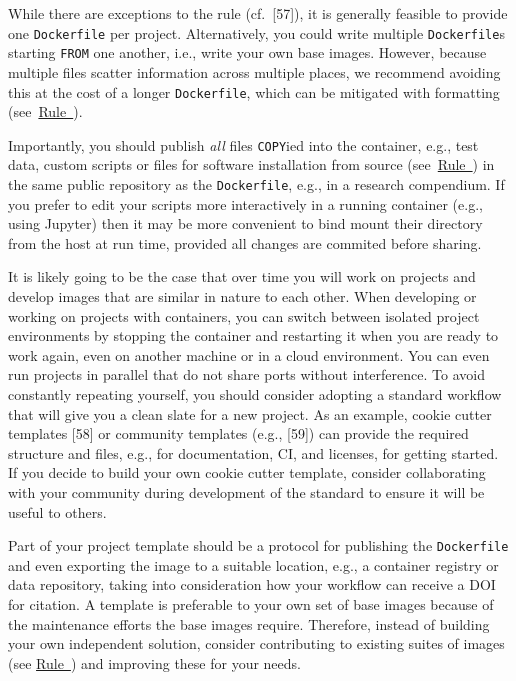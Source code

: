 \documentclass[10pt,letterpaper]{article}
\begin{document}
While there are exceptions to the rule (cf.~{[}57{]}), it is generally
feasible to provide one \texttt{Dockerfile} per project. Alternatively,
you could write multiple \texttt{Dockerfile}s starting \texttt{FROM} one
another, i.e., write your own base images. However, because multiple
files scatter information across multiple places, we recommend avoiding
this at the cost of a longer \texttt{Dockerfile}, which can be mitigated
with formatting
(see~\hyperref[{rule:formatting}]{Rule~}).

Importantly, you should publish \emph{all} files \texttt{COPY}ied into
the container, e.g., test data, custom scripts or files for software
installation from source
(see~\hyperref[{rule:mount}]{Rule~}) in the same
public repository as the \texttt{Dockerfile}, e.g., in a research
compendium. If you prefer to edit your scripts more interactively in a
running container (e.g., using Jupyter) then it may be more convenient
to bind mount their directory from the host at run time, provided all
changes are commited before sharing.

It is likely going to be the case that over time you will work on
projects and develop images that are similar in nature to each other.
When developing or working on projects with containers, you can switch
between isolated project environments by stopping the container and
restarting it when you are ready to work again, even on another machine
or in a cloud environment. You can even run projects in parallel that do
not share ports without interference. To avoid constantly repeating
yourself, you should consider adopting a standard workflow that will
give you a clean slate for a new project. As an example, cookie cutter
templates {[}58{]} or community templates (e.g., {[}59{]}) can provide
the required structure and files, e.g., for documentation, CI, and
licenses, for getting started. If you decide to build your own cookie
cutter template, consider collaborating with your community during
development of the standard to ensure it will be useful to others.

Part of your project template should be a protocol for publishing the
\texttt{Dockerfile} and even exporting the image to a suitable location,
e.g., a container registry or data repository, taking into consideration
how your workflow can receive a DOI for citation. A template is
preferable to your own set of base images because of the maintenance
efforts the base images require. Therefore, instead of building your own
independent solution, consider contributing to existing suites of images
(see \hyperref[{rule:base}]{Rule~}) and improving
these for your needs.
\end{document}

